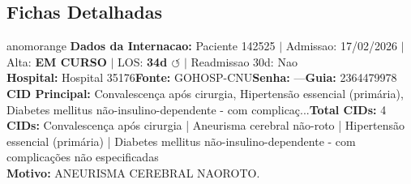 \documentclass[a4paper,10pt]{article}
\begin{document}
\subsection{Fichas Detalhadas}
\begin{anomalycard}[Internacao 261655 | GOHOSP-CNU | ALTO (z=3.74)]{anomorange}
\textbf{Dados da Internacao:} Paciente 142525 $\mid$ Admissao: 17/02/2026 $\mid$ Alta: \textcolor{anomorange}{\textbf{EM CURSO}} $\mid$ LOS: \textbf{34d \textcolor{anomorange}{$\circlearrowleft$}} $\mid$ Readmissao 30d: Nao\\
\textbf{Hospital:} Hospital 35176\quad\textbf{Fonte:} GOHOSP-CNU\quad\textbf{Senha:} ---\quad\textbf{Guia:} 2364479978\\
\textbf{CID Principal:} {\small Convalescença após cirurgia, Hipertensão essencial (primária), Diabetes mellitus não-insulino-dependente - com complicaç...}\quad\textbf{Total CIDs:} 4\\

\textbf{CIDs:} {\scriptsize Convalescença após cirurgia | Aneurisma cerebral não-roto | Hipertensão essencial (primária) | Diabetes mellitus não-insulino-dependente - com complicações não especificadas}\\

\textbf{Motivo:} {\scriptsize ANEURISMA CEREBRAL NAOROTO.}\\


\end{anomalycard}
\end{document}
